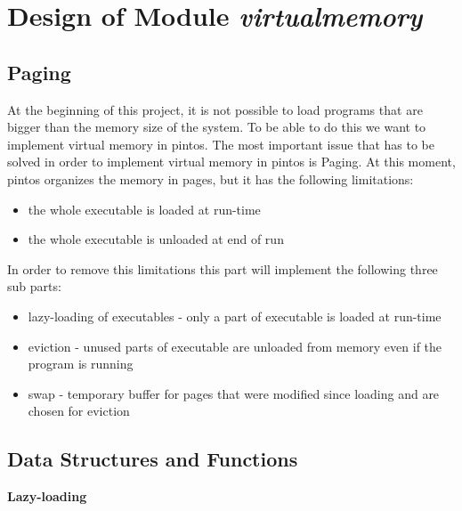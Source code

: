 
\chapter{Design of Module \textit{virtualmemory}}


\section{Paging}

At the beginning of this project, it is not possible to load programs that are bigger than the memory size of the system. To be able to do this we want to implement virtual memory in pintos. The most important issue that has to be solved in order to implement virtual memory in pintos is Paging. At this moment, pintos organizes the memory in pages, but it has the following limitations:
\begin{itemize}
 \item the whole executable is loaded at run-time 
 \item the whole executable is unloaded at end of run
\end{itemize}

In order to remove this limitations this part will implement the following three sub parts:
\begin{itemize}
  \item lazy-loading of executables - only a part of executable is loaded at run-time
  \item	eviction - unused parts of executable are unloaded from memory even if the program is running
  \item swap - temporary buffer for pages that were modified since loading and are chosen for eviction
\end{itemize}

\section{Data Structures and Functions}

\textbf{Lazy-loading}

